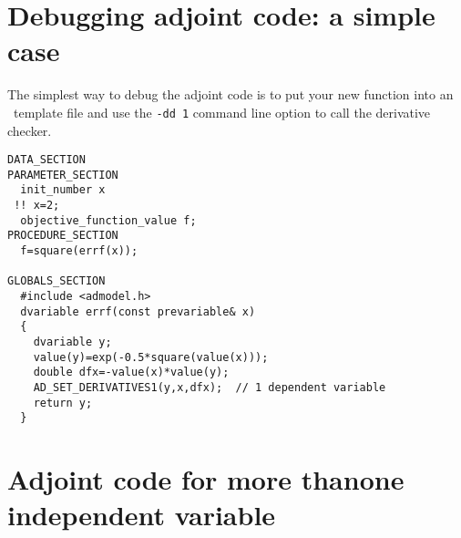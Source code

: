 \section{Debugging adjoint code: a simple case}

The simplest way to debug the adjoint code is to put your new
function into an \ADM\ template file and use the \texttt{-dd 1}
command line option to call the derivative checker.
\begin{lstlisting}
DATA_SECTION
PARAMETER_SECTION
  init_number x
 !! x=2;
  objective_function_value f;
PROCEDURE_SECTION
  f=square(errf(x));
  
GLOBALS_SECTION
  #include <admodel.h>
  dvariable errf(const prevariable& x)
  {
    dvariable y;
    value(y)=exp(-0.5*square(value(x)));
    double dfx=-value(x)*value(y);
    AD_SET_DERIVATIVES1(y,x,dfx);  // 1 dependent variable 
    return y;
  }
\end{lstlisting}


\section{Adjoint code for more than\br one independent variable}

